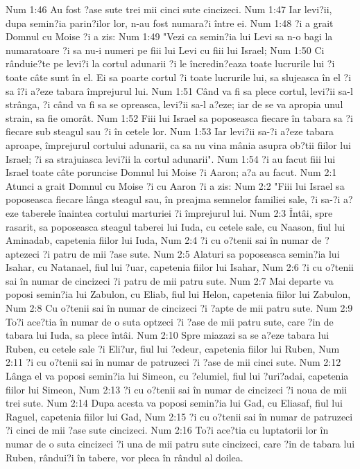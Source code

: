 Num 1:46  Au fost ?ase sute trei mii cinci sute cincizeci.
Num 1:47  Iar levi?ii, dupa semin?ia parin?ilor lor, n-au fost numara?i între ei.
Num 1:48  ?i a grait Domnul cu Moise ?i a zis:
Num 1:49  "Vezi ca semin?ia lui Levi sa n-o bagi la numaratoare ?i sa nu-i numeri pe fiii lui Levi cu fiii lui Israel;
Num 1:50  Ci rânduie?te pe levi?i la cortul adunarii ?i le încredin?eaza toate lucrurile lui ?i toate câte sunt în el. Ei sa poarte cortul ?i toate lucrurile lui, sa slujeasca în el ?i sa î?i a?eze tabara împrejurul lui.
Num 1:51  Când va fi sa plece cortul, levi?ii sa-l strânga, ?i când va fi sa se opreasca, levi?ii sa-l a?eze; iar de se va apropia unul strain, sa fie omorât.
Num 1:52  Fiii lui Israel sa poposeasca fiecare în tabara sa ?i fiecare sub steagul sau ?i în cetele lor.
Num 1:53  Iar levi?ii sa-?i a?eze tabara aproape, împrejurul cortului adunarii, ca sa nu vina mânia asupra ob?tii fiilor lui Israel; ?i sa strajuiasca levi?ii la cortul adunarii".
Num 1:54  ?i au facut fiii lui Israel toate câte poruncise Domnul lui Moise ?i Aaron; a?a au facut.
Num 2:1  Atunci a grait Domnul cu Moise ?i cu Aaron ?i a zis:
Num 2:2  "Fiii lui Israel sa poposeasca fiecare lânga steagul sau, în preajma semnelor familiei sale, ?i sa-?i a?eze taberele înaintea cortului marturiei ?i împrejurul lui.
Num 2:3  Întâi, spre rasarit, sa poposeasca steagul taberei lui Iuda, cu cetele sale, cu Naason, fiul lui Aminadab, capetenia fiilor lui Iuda,
Num 2:4  ?i cu o?tenii sai în numar de ?aptezeci ?i patru de mii ?ase sute.
Num 2:5  Alaturi sa poposeasca semin?ia lui Isahar, cu Natanael, fiul lui ?uar, capetenia fiilor lui Isahar,
Num 2:6  ?i cu o?tenii sai în numar de cincizeci ?i patru de mii patru sute.
Num 2:7  Mai departe va poposi semin?ia lui Zabulon, cu Eliab, fiul lui Helon, capetenia fiilor lui Zabulon,
Num 2:8  Cu o?tenii sai în numar de cincizeci ?i ?apte de mii patru sute.
Num 2:9  To?i ace?tia în numar de o suta optzeci ?i ?ase de mii patru sute, care ?in de tabara lui Iuda, sa plece întâi.
Num 2:10  Spre miazazi sa se a?eze tabara lui Ruben, cu cetele sale ?i Eli?ur, fiul lui ?edeur, capetenia fiilor lui Ruben,
Num 2:11  ?i cu o?tenii sai în numar de patruzeci ?i ?ase de mii cinci sute.
Num 2:12  Lânga el va poposi semin?ia lui Simeon, cu ?elumiel, fiul lui ?uri?adai, capetenia fiilor lui Simeon,
Num 2:13  ?i cu o?tenii sai în numar de cincizeci ?i noua de mii trei sute.
Num 2:14  Dupa acesta va poposi semin?ia lui Gad, cu Eliasaf, fiul lui Raguel, capetenia fiilor lui Gad,
Num 2:15  ?i cu o?tenii sai în numar de patruzeci ?i cinci de mii ?ase sute cincizeci.
Num 2:16  To?i ace?tia cu luptatorii lor în numar de o suta cincizeci ?i una de mii patru sute cincizeci, care ?in de tabara lui Ruben, rândui?i în tabere, vor pleca în rândul al doilea.
